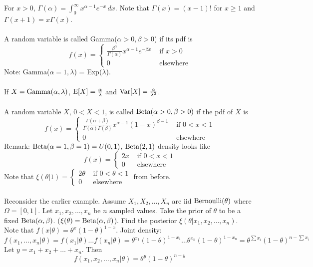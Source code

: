 \documentclass[12pt]{article}
\begin{document}
For $x > 0$, $\Gamma(\alpha) = \int_0^\infty x^{\alpha - 1} e^{-x} \, dx $. Note that $\Gamma(x) = (x-1)!$ for $x \geq 1$ and $\Gamma(x +1) = x\Gamma(x)$. \\~\\
A random variable is called Gamma($\alpha > 0, \beta > 0$) if its pdf is $$ f(x) = \begin{cases} \frac{\beta^\alpha}{\Gamma(\alpha)} x^{\alpha - 1} e^{-\beta x} &\text{ if } x > 0 \\ 0 &\text{ elsewhere} \end{cases} $$ Note: Gamma($\alpha = 1, \lambda$) = Exp($\lambda$). \\~\\
If $X = \text{Gamma}( \alpha, \lambda )$, $\mathrm{E}[ X ] = \frac{\alpha}{\lambda}$ and $\mathrm{Var}[ X ] = \frac{\alpha}{\lambda^2}$. \\~\\
A random variable $X$, $0 < X < 1$, is called $\text{Beta}( \alpha > 0, \beta > 0 )$ if the pdf of $X$ is $$f(x) = \begin{cases} \frac{\Gamma(\alpha + \beta)}{\Gamma(\alpha)\Gamma(\beta)} x^{\alpha - 1}(1-x)^{\beta - 1} &\text{ if } 0 < x < 1 \\ 0 &\text{ elsewhere } \end{cases} $$ 
Remark: $\text{Beta}( \alpha = 1, \beta = 1 ) = U(0,1)$, $\text{Beta}( 2,1 )$ density looks like $$f(x) = \begin{cases} 2x &\text{ if } 0 < x < 1 \\ 0 &\text{ elsewhere} \end{cases} $$ Note that $\xi(\theta|1) = \begin{cases} 2\theta &\text{ if } 0 < \theta < 1 \\ 0 &\text{ elsewhere } \end{cases} $ from before. \\~\\
Reconsider the earlier example. Assume $X_1, X_2, \dots, X_n$ are iid $\mathrm{Bernoulli}( \theta )$ where $\Omega = [0,1]$. Let $x_1, x_2, \dots, x_n$ be $n$ sampled values. Take the prior of $\theta$ to be a fixed $\text{Beta}( \alpha,\beta )$. ($\xi(\theta) = \text{Beta}( \alpha,\beta )$). Find the posterior $\xi(\theta|x_1,x_2,\dots,x_n)$. \\
Note that $f(x|\theta) = \theta^x(1-\theta)^{1-x}$. Joint density: $$ f(x_1,\dots, x_n|\theta) = f(x_1|\theta) \dots f(x_n|\theta) = \theta^{x_1}(1-\theta)^{1-x_1} \dots \theta^{x_n}(1-\theta)^{1-x_n} = \theta^{\sum x_i} (1-\theta)^{n - \sum x_i} $$ 
Let $y = x_1 + x_2 + \dots + x_n$. Then $$f(x_1,x_2,\dots, x_n|\theta) = \theta^y(1-\theta)^{n-y} $$ 
\end{document}

